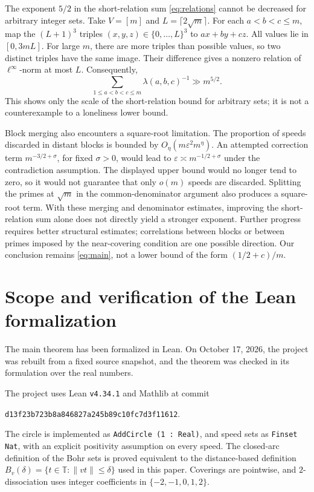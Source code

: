\documentclass[12pt,leqno]{article}
\numberwithin{equation}{section}
\theoremstyle{remark}
\newcommand{\LRtorus}{\mathbb T}
\begin{document}
The exponent $5/2$ in the short-relation sum \eqref{eq:relations} cannot be decreased for arbitrary integer sets. Take $V=[m]$ and $L=\lceil2\sqrt m\rceil$. For each $a<b<c\le m$, map the $(L+1)^3$ triples $(x,y,z)\in\{0,\ldots,L\}^3$ to $ax+by+cz$. All values lie in $[0,3mL]$. For large $m$, there are more triples than possible values, so two distinct triples have the same image. Their difference gives a nonzero relation of $\ell^\infty$-norm at most $L$. Consequently,
\begin{equation}\label{eq:sharp}
\sum_{1\le a<b<c\le m}\lambda(a,b,c)^{-1}\gg m^{5/2}.
\end{equation}
This shows only the scale of the short-relation bound for arbitrary sets; it is not a counterexample to a loneliness lower bound.

Block merging also encounters a square-root limitation. The proportion of speeds discarded in distant blocks is bounded by $O_\eta(m\varepsilon^2m^\eta)$. An attempted correction term $m^{-3/2+\sigma}$, for fixed $\sigma>0$, would lead to $\varepsilon\asymp m^{-1/2+\sigma}$ under the contradiction assumption. The displayed upper bound would no longer tend to zero, so it would not guarantee that only $o(m)$ speeds are discarded. Splitting the primes at $\sqrt m$ in the common-denominator argument also produces a square-root term. With these merging and denominator estimates, improving the short-relation sum alone does not directly yield a stronger exponent. Further progress requires better structural estimates; correlations between blocks or between primes imposed by the near-covering condition are one possible direction. Our conclusion remains \eqref{eq:main}, not a lower bound of the form $(1/2+c)/m$.

\clearpage
\appendix
\section{Scope and verification of the Lean formalization}

The main theorem has been formalized in Lean. On October 17, 2026, the project was rebuilt from a fixed source snapshot, and the theorem was checked in its formulation over the real numbers.

The project uses Lean \texttt{v4.34.1} and Mathlib at commit
\begin{center}
\small
\texttt{d13f23b723b8a846827a245b89c10fc7d3f11612}.
\end{center}
The circle is implemented as \texttt{AddCircle (1 : Real)}, and speed sets as
\texttt{Finset Nat}, with an explicit positivity assumption on every speed.
The closed-arc definition of the Bohr sets is proved equivalent to the distance-based definition $B_v(\delta)=\{t\in\LRtorus:\|vt\|\le\delta\}$ used in this paper.
Coverings are pointwise, and $2$-dissociation uses integer coefficients in
$\{-2,-1,0,1,2\}$.
\end{document}
